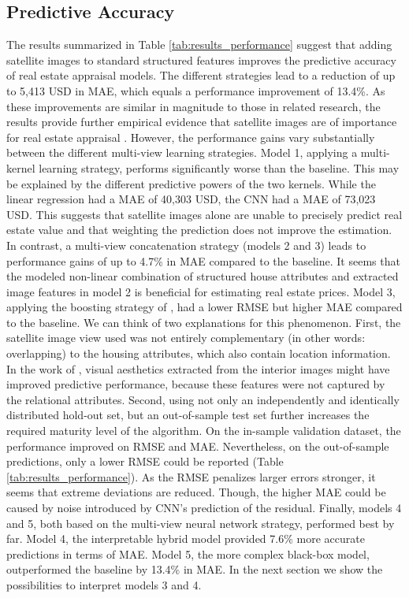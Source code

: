 \documentclass[letterpaper]{article}
\begin{document}
\subsection{Predictive Accuracy}
The results summarized in Table \ref{tab:results_performance} suggest that adding satellite images to standard structured features improves the predictive accuracy of real estate appraisal models. The different strategies lead to a reduction of up to 5,413 USD in MAE, which equals a performance improvement of 13.4\%. As these improvements are similar in magnitude to those in related research, the results provide further empirical evidence that satellite images are of importance for real estate appraisal \cite{law2019take, bency2017beyond}. However, the performance gains vary substantially between the different multi-view learning strategies. Model 1, applying a multi-kernel learning strategy, performs significantly worse than the baseline. This may be explained by the different predictive powers of the two kernels. While the linear regression had a MAE of 40,303 USD, the CNN had a MAE of 73,023 USD. This suggests that satellite images alone are unable to precisely predict real estate value and that weighting the prediction does not improve the estimation. In contrast, a multi-view concatenation strategy (models 2 and 3) leads to performance gains of up to 4.7\% in MAE compared to the baseline. It seems that the modeled non-linear combination of structured house attributes and extracted image features in model 2 is beneficial for estimating real estate prices. Model 3, applying the boosting strategy of \citeauthor{naumzik2020one} \citeyearpar{naumzik2020one}, had a lower RMSE but higher MAE compared to the baseline. We can think of two explanations for this phenomenon. First, the satellite image view used was not entirely complementary (in other words: overlapping) to the housing attributes, which also contain location information. In the work of \citeauthor{naumzik2020one} \citeyearpar{naumzik2020one}, visual aesthetics extracted from the interior images might have improved predictive performance, because these features were not captured by the relational attributes. Second, using not only an independently and identically distributed hold-out set, but an out-of-sample test set further increases the required maturity level of the algorithm. On the in-sample validation dataset, the performance improved on RMSE and MAE. Nevertheless, on the out-of-sample predictions, only a lower RMSE could be reported (Table \ref{tab:results_performance}). As the RMSE penalizes larger errors stronger, it seems that extreme deviations are reduced.
Though, the higher MAE could be caused by noise introduced by CNN's prediction of the residual. Finally, models 4 and 5, both based on the multi-view neural network strategy, performed best by far. Model 4, the interpretable hybrid model provided 7.6\% more accurate predictions in terms of MAE. Model 5, the more complex black-box model, outperformed the baseline by 13.4\% in MAE. In the next section we show the possibilities to interpret models 3 and 4.
\end{document}

